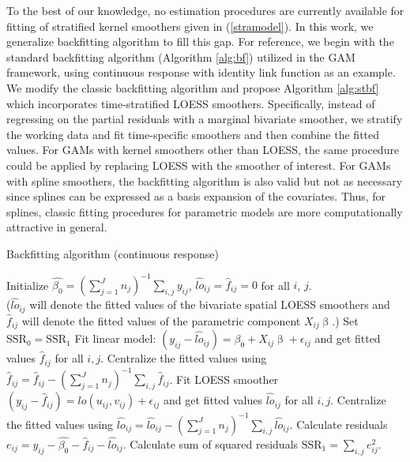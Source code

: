 	To the best of our knowledge, no estimation procedures are currently available for fitting of stratified kernel smoothers given in (\ref{stramodel}). In this work, we generalize backfitting algorithm to fill this gap. For reference, we begin with the standard backfitting algorithm (Algorithm \ref{alg:bf}) utilized in the GAM framework, using continuous response with identity link function as an example.  We modify the classic backfitting algorithm and propose Algorithm \ref{alg:stbf} which incorporates time-stratified LOESS smoothers. Specifically, instead of regressing on the partial residuals with a marginal bivariate smoother, we stratify the working data and fit time-specific smoothers and then combine the fitted values. For GAMs with kernel smoothers other than LOESS, the same procedure could be applied by replacing LOESS with the smoother of interest. For GAMs with spline smoothers, the backfitting algorithm is also valid but not as necessary since splines can be expressed as a basis expansion of the covariates. Thus, for splines, classic fitting procedures for parametric models are more computationally attractive in general. 
	
	\begin{algorithm}[h]
		\caption{Backfitting algorithm (continuous response)}
		\label{alg:bf}
		\begin{algorithmic}[1]
			\State Initialize $\hat{\beta_0}=(\sum_{j=1}^J n_j)^{-1}\sum_{i,j} y_{ij}$, $\hat{lo}_{ij}=\hat{f}_{ij}=0$ for all $i$, $j$. \\
			($\hat{lo}_{ij}$ will denote the fitted values of the bivariate spatial LOESS smoothers and $\hat{f}_{ij}$ will denote the fitted values of the parametric component $X_{ij}\upbeta$.)
			\State Set $\text{SSR}_0=\text{SSR}_1$
			\State Fit linear model: $(y_{ij}-\hat{lo}_{ij}) = \beta_0 + X_{ij}\upbeta + \epsilon_{ij}$ and get fitted values $\hat{f}_{ij}$ for all $i,j$. 
			\State Centralize the fitted values using $\hat{f}_{ij}=\hat{f}_{ij}-(\sum_{j=1}^J n_j)^{-1}\sum_{i,j}\hat{f}_{ij}$.
			\State Fit LOESS smoother $(y_{ij}-\hat{f}_{ij}) = lo(u_{ij},v_{ij}) + \epsilon_{ij}$ and get fitted values $\hat{lo}_{ij}$ for all $i,j$. 
			\State Centralize the fitted values using $\hat{lo}_{ij}=\hat{lo}_{ij}-(\sum_{j=1}^J n_j)^{-1}\sum_{i,j} \hat{lo}_{ij}$.
			\State Calculate residuals $e_{ij}=y_{ij}-\hat{\beta_0}-\hat{f}_{ij}-\hat{lo}_{ij}$.
			\State Calculate sum of squared residuals $\text{SSR}_1=\sum_{i,j} e_{ij}^2$.
			\EndWhile
		\end{algorithmic}
	\end{algorithm}
	
